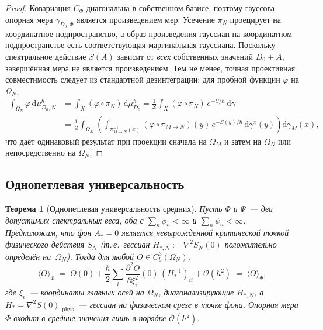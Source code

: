 \documentclass[12pt,a4paper]{article}
\theoremstyle{plain}
\newtheorem{theorem}{Теорема}[section]
\theoremstyle{definition}
\theoremstyle{remark}
\newcommand{\dd}{\mathrm{d}}
\newcommand{\order}{\mathcal{O}}
\begin{document}
\begin{proof}
Ковариация $C_\Phi$ диагональна в собственном базисе, поэтому
гауссова опорная мера $\gamma_{D_0,\Phi}$ является произведением
мер.  Усечение $\pi_N$ проецирует на координатное подпространство,
а образ произведения гауссиан на координатном подпространстве
есть соответствующая маргинальная гауссиана.  Поскольку
спектральное действие $S(A)$ зависит от \emph{всех} собственных
значений $D_0 + A$, завершённая мера не является произведением.
Тем не менее, точная проективная совместимость следует из
стандартной дезинтеграции: для пробной функции $\varphi$ на
$\Omega_N$,
\begin{align*}
  \int_{\Omega_N}\varphi\,\dd\mu_{D_0,N}^\hbar
  &= \int_X (\varphi \circ \pi_N)\,\dd\mu_{D_0}^\hbar
  = \frac{1}{Z}\int_X (\varphi\circ\pi_N)\,e^{-S/\hbar}\,\dd\gamma \\
  &= \frac{1}{Z}\int_{\Omega_M}
    \left(\int_{\pi_{M\to N}^{-1}(x)}
      (\varphi\circ\pi_{M\to N})(y)\,e^{-S(y)/\hbar}
    \,\dd\gamma^x(y)\right)\dd\gamma_M(x),
\end{align*}
что даёт одинаковый результат при проекции сначала на $\Omega_M$
и затем на $\Omega_N$ или непосредственно на $\Omega_N$.
\end{proof}

\subsection{Однопетлевая универсальность}
\label{subsec:one-loop}

\begin{theorem}[Однопетлевая универсальность средних]
\label{thm:one-loop-universality}
Пусть $\Phi$ и $\Psi$~--- два допустимых спектральных веса, оба с
$\sum_n \phi_n < \infty$ и $\sum_n \psi_n < \infty$.
Предположим, что фон $A_* = 0$ является невырожденной критической
точкой физического действия $S_N$ (т.\,е.\ гессиан $H_{*,N} :=
\nabla^2 S_N(0)$ положительно определён на~$\Omega_N$).
Тогда для любой $O \in C^3_b(\Omega_N)$,
\begin{equation}\label{eq:one-loop-univ}
  \langle O \rangle_\Phi
  \;=\; O(0)
  + \frac{\hbar}{2}\sum_i \frac{\partial^2 O}{\partial \xi_i^2}(0)\,
    (H_*^{-1})_{ii}
  + \order(\hbar^2)
  \;=\; \langle O \rangle_\Psi,
\end{equation}
где $\xi_i$~--- координаты главных осей на $\Omega_N$,
диагонализирующие $H_{*,N}$, а
$H_* = \nabla^2 S(0)|_{\mathrm{phys}}$~--- гессиан на
физическом срезе в точке фона.  Опорная мера $\Phi$ входит в
средние значения лишь в порядке $\order(\hbar^2)$.
\end{theorem}
\end{document}
